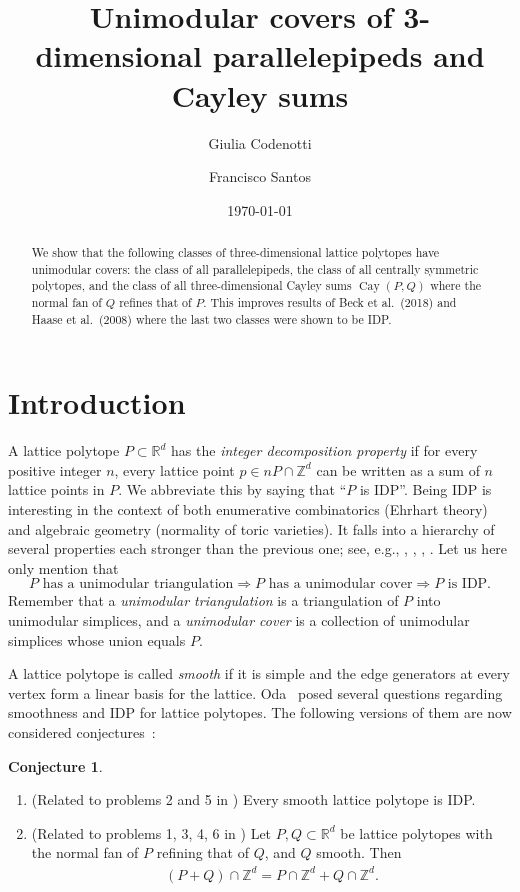 \documentclass{amsart}
\date{\today}
\author[G.~Codenotti]{Giulia Codenotti}
\author[F.~Santos]{Francisco Santos}
\title{Unimodular covers of 3-dimensional parallelepipeds and Cayley sums}
\theoremstyle{plain}
\theoremstyle{definition}
\newtheorem{conjecture}[theorem]{Conjecture}
\newcommand{\Z}{ \ensuremath{\mathbb{Z}}}
\newcommand{\R}{ \ensuremath{\mathbb{R}}}
\newcommand{\cayley}{\operatorname{Cay}}
\begin{document}
\begin{abstract}
We show that the following classes of three-dimensional lattice polytopes have unimodular covers: the class of all parallelepipeds, the class of all centrally symmetric polytopes, and the class of all three-dimensional Cayley sums $\cayley(P,Q)$ where the normal fan of $Q$ refines that of $P$. This improves results of Beck et al.~(2018) and Haase et al.~(2008) where the last two classes were shown to be IDP.
\end{abstract}

\maketitle

\tableofcontents

\section{Introduction}

A lattice polytope $P\subset \R^d$ has the \emph{integer decomposition property} if for every positive integer $n$, every lattice point $p \in nP\cap \Z^d$ can be written as a sum of $n$ lattice points in $P$. We abbreviate this by saying that ``$P$ is IDP''. Being IDP is interesting in the context of  both enumerative combinatorics (Ehrhart theory) and algebraic geometry (normality of toric varieties). It falls into a hierarchy of several properties each stronger than the previous one; see, e.g., \cite[Section 2.D]{BGbook}, \cite[Sect. 1.2.5]{HPPS-survey}, \cite[p. 2097]{mfo2004}, \cite[p. 2313]{mfo2007}.
Let us here only mention that
\[
P \text{ has a unimodular triangulation}\Rightarrow
P \text{ has a unimodular cover}\Rightarrow
P \text{ is IDP.}
\]
Remember that a \emph{unimodular triangulation} is a triangulation of $P$ into unimodular simplices, and a \emph{unimodular cover} is a collection of unimodular simplices whose union equals $P$. 

A lattice polytope is called \emph{smooth} if it is simple and the edge generators at every vertex form a linear basis for the lattice. 
%
Oda~\cite{Oda1997} posed several questions regarding smoothness and IDP for lattice polytopes. The following versions of them are now considered conjectures~\cite{HNPS2008,mfo2007}:
\begin{conjecture}
\label{conj:Oda}
\begin{enumerate}
\item 
\label{itm:smoothIDP}
(Related to problems 2 and 5 in \cite{Oda1997})
Every smooth lattice polytope is IDP.
\item 
\label{itm:mixedIDP}
(Related to problems 1, 3, 4, 6 in \cite{Oda1997}) Let $P, Q\subset \R^d$ be lattice polytopes with the normal fan of $P$ refining that of $Q$, and $Q$ smooth. Then
\begin{align*}
\label{eq:mixedIDP}
(P+Q) \cap \Z^d = P \cap \Z^d + Q \cap \Z^d.
\end{align*}
\end{enumerate}
\end{conjecture}
\end{document}
